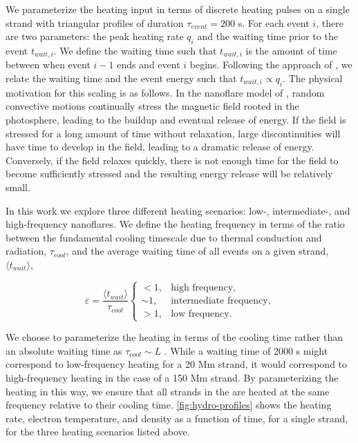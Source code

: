 We parameterize the heating input in terms of discrete heating pulses on a single strand with triangular profiles of duration $\tau_{event}=200$ s. For each event $i$, there are two parameters: the peak heating rate $q_i$ and the waiting time prior to the event $t_{wait,i}$. We define the waiting time such that $t_{wait,i}$ is the amount of time between when event $i-1$ ends and event $i$ begins. Following the approach of \citet{cargill_active_2014}, we relate the waiting time and the event energy such that $t_{wait,i}\propto q_i$. The physical motivation for this scaling is as follows. In the nanoflare model of \citet{parker_nanoflares_1988}, random convective motions continually stress the magnetic field rooted in the photosphere, leading to the buildup and eventual release of energy. If the field is stressed for a long amount of time without relaxation, large discontinuities will have time to develop in the field, leading to a dramatic release of energy. Conversely, if the field relaxes quickly, there is not enough time for the field to become sufficiently stressed and the resulting energy release will be relatively small. 

In this work we explore three different heating scenarios: low-, intermediate-, and high-frequency nanoflares. We define the heating frequency in terms of the ratio between the fundamental cooling timescale due to thermal conduction and radiation, $\tau_{cool}$, and the average waiting time of all events on a given strand, $\langle t_{wait}\rangle$,

\begin{equation}\label{eq:heating_types}
    \varepsilon = \frac{\langle t_{wait}\rangle}{\tau_{cool}}
    \begin{cases} 
        < 1, &  \text{high frequency},\\
        \sim1, & \text{intermediate frequency}, \\
        > 1, & \text{low frequency}.
     \end{cases}
\end{equation}

We choose to parameterize the heating in terms of the cooling time rather than an absolute waiting time as $\tau_{cool}\sim L$ \citep[see appendix of][]{cargill_active_2014}. While a waiting time of 2000 s might correspond to low-frequency heating for a 20 Mm strand, it would correspond to high-frequency heating in the case of a 150 Mm strand. By parameterizing the heating in this way, we ensure that all strands in the \AR{} are heated at the same frequency relative to their cooling time. \autoref{fig:hydro-profiles} shows the heating rate, electron temperature, and density as a function of time, for a single strand, for the three heating scenarios listed above. 

